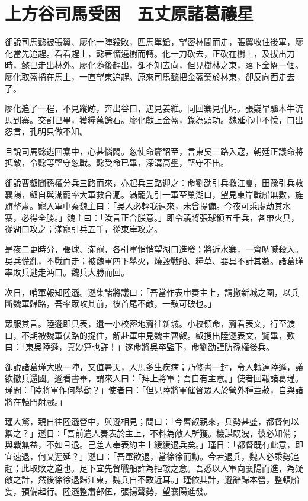 
\chapter{上方谷司馬受困　五丈原諸葛禳星}

卻說司馬懿被張翼、廖化一陣殺敗，匹馬單鎗，望密林間而走，張翼收住後軍，廖化當先追趕。看看趕上，懿著慌遶樹而轉。化一刀砍去，正砍在樹上，及拔出刀時，懿已走出林外。廖化隨後趕出，卻不知去向，但見樹林之東，落下金盔一個。廖化取盔捎在馬上，一直望東追趕。原來司馬懿把金盔棄於林東，卻反向西走去了。

廖化追了一程，不見蹤跡，奔出谷口，遇見姜維。同回寨見孔明。張嶷早驅木牛流馬到寨。交割已畢，獲糧萬餘石。廖化獻上金盔，錄為頭功。魏延心中不悅，口出怨言，孔明只做不知。

且說司馬懿逃回寨中，心甚惱悶。忽使命齎詔至，言東吳三路入寇，朝廷正議命將抵敵，令懿等堅守忽戰。懿受命已畢，深溝高壘，堅守不出。

卻說曹叡聞孫權分兵三路而來，亦起兵三路迎之：命劉劭引兵救江夏，田豫引兵救襄陽，叡自與滿寵率大軍救合淝。滿寵先引一軍至巢湖口，望見東岸戰船無數，旌旗整肅。寵入軍中秦魏主曰：「吳人必輕我遠來，未曾提備。今夜可乘虛劫其水寨，必得全勝。」魏主曰：「汝言正合朕意。」即令驍將張球領五千兵，各帶火具，從湖口攻之；滿寵引兵五千，從東岸攻之。

是夜二更時分，張球、滿寵，各引軍悄悄望湖口進發；將近水寨，一齊吶喊殺入。吳兵慌亂，不戰而走；被魏軍四下舉火，燒毀戰船、糧草、器具不計其數。諸葛瑾率敗兵逃走沔口。魏兵大勝而回。

次日，哨軍報知陸遜。遜集諸將議曰：「吾當作表申奏主上，請撤新城之圍，以兵斷魏軍歸路，吾率眾攻其前，彼首尾不敵，一鼓可破也。」

眾服其言。陸遜即具表，遺一小校密地齎往新城。小校領命，齎看表文，行至渡口，不期被魏軍伏路的捉住，解赴軍中見魏主曹叡。叡搜出陸遜表文，覽畢，歎曰：「東吳陸遜，真妙算也許！」遂命將吳卒監下，命劉劭謹防孫權後兵。

卻說諸葛瑾大敗一陣，又值暑天，人馬多生疾病；乃修書一封，令人轉達陸遜，議欲撤兵還國。遜看書畢，謂來人曰：「拜上將軍；吾自有主意。」使者回報諸葛瑾。瑾問：「陸將軍作何舉動？」使者曰：「但見陸將軍催督眾人於營外種荳菽，自與諸將在轅門射戲。」

瑾大驚，親自往陸遜營中，與遜相見；問曰：「今曹叡親來，兵勢甚盛，都督何以禦之？」遜日：「吾前遣人奏表於主上，不料為敵人所獲。機謀既洩，彼必知備；與戰無益，不如且退。己差人奉表約主上緩緩退兵矣。」瑾日：「都督既有此意，即宜速退，何又遲延？」遜曰：「吾軍欲退，當徐徐而動。今若退兵，魏人必乘勢追趕；此取敗之道也。足下宜先督戰船詐為拒敵之意。吾悉以人軍向襄陽而進，為疑敵之計，然後徐徐退歸江東，魏兵自不敢近耳。」瑾依其計，遜辭歸本營，整頓船隻，預備起行。陸遜整肅部伍，張揚聲勢，望襄陽進發。

